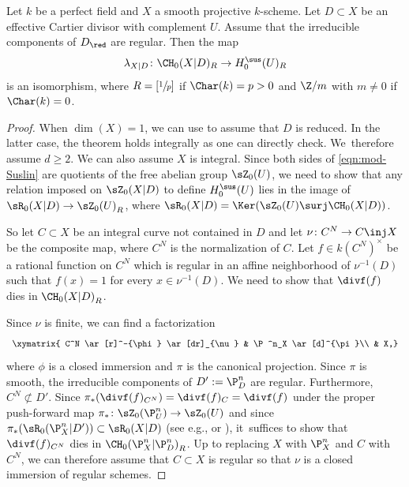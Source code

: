 \begin{thm}\label{thm:M1}
Let $k$ be a perfect field and $X$ a smooth projective $k$-scheme.
Let $D \subset X$ be an effective Cartier divisor with complement $U$.
Assume that the irreducible components of $D_\red$ are regular.
Then the map
\[
\lambda_{X|D} \colon \CH_0(X|D)_R \to H^{\sus}_0(U)_R
\]
is an isomorphism, where
$R = [\sfrac{1}{p}]$ if $\Char(k) = p > 0$
and ${\Z}/m$ with $m \neq 0$ if $\Char(k) = 0$.
\end{thm}
\begin{proof}
When $\dim(X) = 1$, we can use \cite[Th.\,1.3(2)]{Miyazaki} to
assume that $D$ is reduced. In the latter case, the theorem holds integrally
as one can directly check. We~therefore assume $d \ge 2$.
We can also assume $X$ is integral.
Since both sides of \eqref{eqn:mod-Suslin} are quotients of the free abelian
group $\sZ_0(U)$, we need to show that
any relation imposed on $\sZ_0(X|D)$ to define $H^{\sus}_0(U)$ lies in the image of
$\sR_0(X|D) \to {\sZ_0(U)}_R$, where $\sR_0(X|D) = \Ker(\sZ_0(U) \surj
\CH_0(X|D))$.

So let $C \subset X$ be an integral curve not contained in $D$ and let
$\nu \colon C^N \to C \inj X$ be the composite map, where $C^N$ is the normalization
of $C$. Let $f \in k(C^N)^{\times}$ be a rational
function on $C^N$ which is regular in an affine neighborhood of $\nu^{-1}(D)$
such that $f(x) = 1$ for every $x \in \nu^{-1}(D)$. We need to show that
$\divf(f)$ dies in ${\CH_0(X|D)}_R$.

Since $\nu$ is finite, we can find a factorization
\begin{equation}\label{eqn:M1-0}
\begin{array}{c}
\xymatrix{
C^N \ar[r]^-{\phi} \ar[dr]_{\nu} & \P^n_X \ar[d]^{\pi}\\
& X,}
\end{array}
\end{equation}
where $\phi$ is a closed immersion and $\pi$ is the canonical projection.
Since $\pi$ is smooth, the irreducible components of
$D' := \P^n_D$ are regular. Furthermore, $C^N \not\subset D'$.
Since $\pi_*(\divf(f)_{C^N}) = \divf(f)_C = \divf(f)$
under the proper push-forward map
$\pi_* \colon \sZ_0(\P^n_U) \to \sZ_0(U)$ and since
$\pi_*(\sR_0(\P^n_X|D')) \subset \sR_0(X|D)$ (see e.g., \cite[\S2]{KPv} or
\cite[Lem.\,2.7]{BS}),
it~suffices to show that
$\divf(f)_{C^N}$ dies in ${\CH_0(\P^n_X|\P^n_D)}_R$.
Up to replacing $X$ with $\P^n_X$ and $C$ with $C^N$, we can therefore assume that
$C \subset X$ is regular so that $\nu$ is a closed immersion of regular
schemes.


\end{proof}
